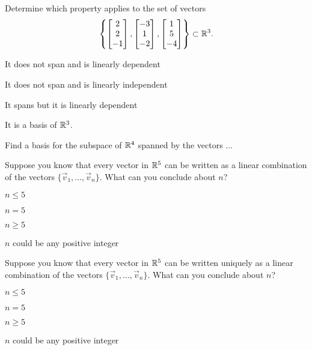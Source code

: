 \documentclass{article}[12pt]
\begin{document}
\begin{readinessAssuranceTest}
\item Determine which property applies to the set of vectors $$\left\{ \begin{bmatrix}  2 \\ 2 \\ -1 \end{bmatrix}, \begin{bmatrix} -3 \\ 1 \\ -2 \end{bmatrix} , \begin{bmatrix} 1 \\ 5 \\ -4 \end{bmatrix}\right\}\subset \mathbb{R}^3.$$

\begin{readinessAssuranceTestChoices}
\item It does not span and is linearly dependent
\item It does not span and is linearly independent
\item It spans but it is linearly dependent
\item It is a basis of $\mathbb{R}^3$.
\end{readinessAssuranceTestChoices}


\item Find a basis for the subspace of $\mathbb{R}^4$ spanned by the vectors ...


\item Suppose you know that every vector in $\mathbb{R}^5$ can be written as a linear combination of the vectors $\{\vec{v}_1, \ldots, \vec{v}_n\}$.  What can you conclude about $n$?

\begin{readinessAssuranceTestChoices}
\item $n \leq 5$
\item $n=5$
\item $n \geq 5$
\item $n$ could be any positive integer
\end{readinessAssuranceTestChoices}

\item Suppose you know that every vector in $\mathbb{R}^5$ can be written uniquely as a linear combination of the vectors $\{\vec{v}_1, \ldots, \vec{v}_n\}$.  What can you conclude about $n$?

\begin{readinessAssuranceTestChoices}
\item $n \leq 5$
\item $n=5$
\item $n \geq 5$
\item $n$ could be any positive integer
\end{readinessAssuranceTestChoices}


\end{readinessAssuranceTest}
\end{document}
